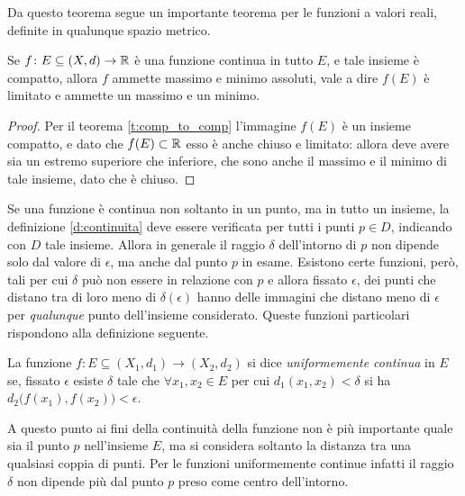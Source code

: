 Da questo teorema segue un importante teorema per le funzioni a valori reali, definite in qualunque spazio metrico.
\begin{teorema}[Weierstrass]
\label{t:weierstrass}
Se $f\colon E\subseteq (X,d)\to\mathbb{R}$ è una funzione continua in tutto $E$, e tale insieme è compatto, allora $f$ ammette massimo e minimo assoluti, vale a dire $f(E)$ è limitato e ammette un massimo e un minimo.
\end{teorema}
\begin{proof}
Per il teorema \ref{t:comp_to_comp} l'immagine $f(E)$ è un insieme compatto, e dato che $f(E)\subset\mathbb{R}$ esso è anche chiuso e limitato: allora deve avere sia un estremo superiore che inferiore, che sono anche il massimo e il minimo di tale insieme, dato che è chiuso.
\end{proof}
Se una funzione è continua non soltanto in un punto, ma in tutto un insieme, la definizione \ref{d:continuita} deve essere verificata per tutti i punti $p\in D$, indicando con $D$ tale insieme. Allora in generale il raggio $\delta$ dell'intorno di $p$ non dipende solo dal valore di $\epsilon$, ma anche dal punto $p$ in esame. Esistono certe funzioni, però, tali per cui $\delta$ può non essere in relazione con $p$ e allora fissato $\epsilon$, dei punti che distano tra di loro meno di $\delta(\epsilon)$ hanno delle immagini che distano meno di $\epsilon$ per \emph{qualunque} punto dell'insieme considerato. Queste funzioni particolari rispondono alla definizione seguente.
\begin{definizione}
\label{d:continuita_uniforme}
La funzione $f\colon E\subseteq (X_1,d_1)\to(X_2,d_2)$ si dice \emph{uniformemente continua} in $E$ se, fissato $\epsilon$ esiste $\delta$ tale che $\forall x_1,x_2\in E$ per cui $d_1(x_1,x_2)<\delta$ si ha $d_2\big(f(x_1),f(x_2)\big)<\epsilon$.
\end{definizione}
A questo punto ai fini della continuità della funzione non è più importante quale sia il punto $p$ nell'insieme $E$, ma si considera soltanto la distanza tra una qualsiasi coppia di punti. Per le funzioni uniformemente continue infatti il raggio $\delta$ non dipende più dal punto $p$ preso come centro dell'intorno.

